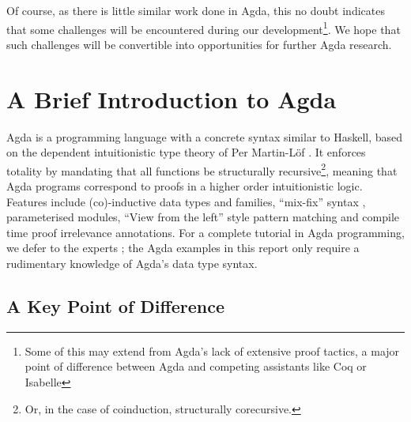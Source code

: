\documentclass[a4paper]{jfp}
\begin{document}
Of course, as there is little similar work done in Agda, this no doubt indicates that some challenges will be encountered during our development\footnote{Some of this may extend from Agda's lack of extensive proof tactics, a major point of difference between Agda and competing assistants like Coq or Isabelle}. We hope that such challenges will be convertible into opportunities for further Agda research.
  

\section{A Brief Introduction to Agda}
 
Agda is a programming language with a concrete syntax similar to Haskell, based on the dependent intuitionistic type theory of Per Martin-L\"of \cite{MartinLof:1984tr}. It enforces totality by mandating that all functions be structurally recursive\footnote{Or, in the case of coinduction, structurally corecursive.}, meaning that Agda programs correspond to proofs in a higher order intuitionistic logic. Features include (co)-inductive data types and families, ``mix-fix'' syntax \cite{springerlink:10.1007/978-3-642-24452-0_5}, parameterised modules, ``View from the left'' style pattern matching \cite{McBride:2004:VL:967492.967496} and compile time proof irrelevance annotations. For a complete tutorial in Agda programming, we defer to the experts \cite{conf/afp/norell08}; the Agda examples in this report only require a rudimentary knowledge of Agda's data type syntax.

\subsection{A Key Point of Difference}
\end{document}
